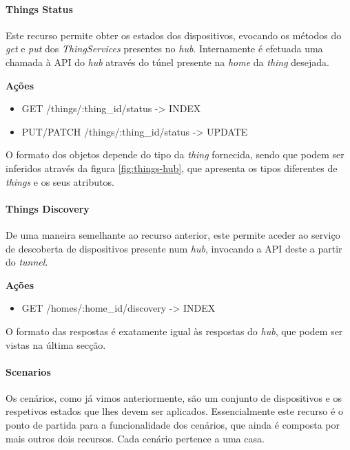 \paragraph*{Things Status}

Este recurso permite obter os estados dos dispositivos, evocando os métodos do \textit{get} e \textit{put} dos \textit{ThingServices} presentes no \textit{hub}. Internamente é efetuada uma chamada à API do \textit{hub} através do túnel presente na \textit{home} da \textit{thing} desejada.

\textbf{Ações}
\begin{itemize}
    \item GET /things/:thing{\_}id/status -> INDEX
    \item PUT/PATCH /things/:thing{\_}id/status -> UPDATE
\end{itemize}

O formato dos objetos depende do tipo da \textit{thing} fornecida, sendo que  podem ser inferidos através da figura \ref{fig:things-hub}, que apresenta os tipos diferentes de \textit{things} e os seus atributos.

\paragraph*{Things Discovery}

De uma maneira semelhante ao recurso anterior, este permite aceder ao serviço de descoberta de dispositivos presente num \textit{hub}, invocando a API deste a partir do \textit{tunnel}.

\textbf{Ações}
\begin{itemize}
    \item GET /homes/:home{\_}id/discovery -> INDEX
\end{itemize}

O formato das respostas é exatamente igual às respostas do \textit{hub}, que podem ser vistas na última secção.


\paragraph*{Scenarios}

Os cenários, como já vimos anteriormente, são um conjunto de dispositivos e os respetivos estados que lhes devem ser aplicados. Essencialmente este recurso é o ponto de partida para a funcionalidade dos cenários, que ainda é composta por mais outros dois recursos. Cada cenário pertence a uma casa.

